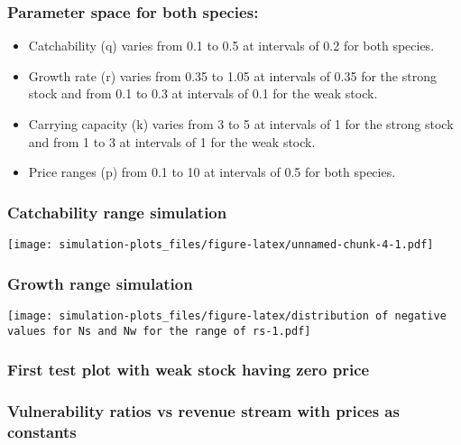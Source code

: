 \documentclass[
]{article}
\providecommand{\tightlist}{%
  \setlength{\itemsep}{0pt}\setlength{\parskip}{0pt}}
\begin{document}
\hypertarget{parameter-space-for-both-species}{%
\subsubsection{Parameter space for both
species:}\label{parameter-space-for-both-species}}

\begin{itemize}
\tightlist
\item
  Catchability (q) varies from 0.1 to 0.5 at intervals of 0.2 for both
  species.
\item
  Growth rate (r) varies from 0.35 to 1.05 at intervals of 0.35 for the
  strong stock and from 0.1 to 0.3 at intervals of 0.1 for the weak
  stock.
\item
  Carrying capacity (k) varies from 3 to 5 at intervals of 1 for the
  strong stock and from 1 to 3 at intervals of 1 for the weak stock.
\item
  Price ranges (p) from 0.1 to 10 at intervals of 0.5 for both species.
\end{itemize}

\hypertarget{catchability-range-simulation}{%
\subsubsection{Catchability range
simulation}\label{catchability-range-simulation}}

\texttt{[image: simulation-plots\_files/figure-latex/unnamed-chunk-4-1.pdf]}

\hypertarget{growth-range-simulation}{%
\subsubsection{Growth range simulation}\label{growth-range-simulation}}

\texttt{[image: simulation-plots\_files/figure-latex/distribution of negative values for Ns and Nw for the range of rs-1.pdf]}

\hypertarget{first-test-plot-with-weak-stock-having-zero-price}{%
\subsubsection{First test plot with weak stock having zero
price}\label{first-test-plot-with-weak-stock-having-zero-price}}

\hypertarget{vulnerability-ratios-vs-revenue-stream-with-prices-as-constants}{%
\subsubsection{Vulnerability ratios vs revenue stream with prices as
constants}\label{vulnerability-ratios-vs-revenue-stream-with-prices-as-constants}}
\end{document}

